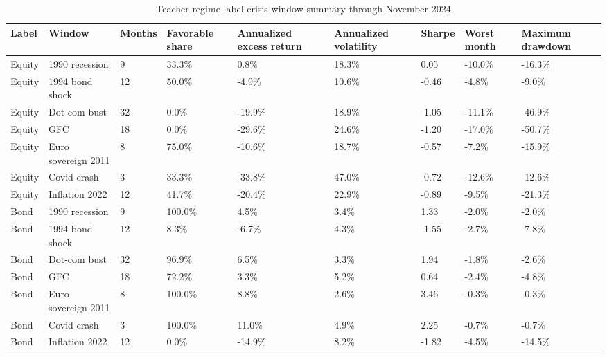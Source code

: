 \begin{table}[!htbp]
\centering
\caption{Teacher regime label crisis-window summary through November 2024}
\small
\begin{tabular}{lllllllll}
\toprule
Label & Window & Months & Favorable share & Annualized excess return & Annualized volatility & Sharpe & Worst month & Maximum drawdown \\
\midrule
Equity & 1990 recession & 9 & 33.3\% & 0.8\% & 18.3\% & 0.05 & -10.0\% & -16.3\% \\
Equity & 1994 bond shock & 12 & 50.0\% & -4.9\% & 10.6\% & -0.46 & -4.8\% & -9.0\% \\
Equity & Dot-com bust & 32 & 0.0\% & -19.9\% & 18.9\% & -1.05 & -11.1\% & -46.9\% \\
Equity & GFC & 18 & 0.0\% & -29.6\% & 24.6\% & -1.20 & -17.0\% & -50.7\% \\
Equity & Euro sovereign 2011 & 8 & 75.0\% & -10.6\% & 18.7\% & -0.57 & -7.2\% & -15.9\% \\
Equity & Covid crash & 3 & 33.3\% & -33.8\% & 47.0\% & -0.72 & -12.6\% & -12.6\% \\
Equity & Inflation 2022 & 12 & 41.7\% & -20.4\% & 22.9\% & -0.89 & -9.5\% & -21.3\% \\
Bond & 1990 recession & 9 & 100.0\% & 4.5\% & 3.4\% & 1.33 & -2.0\% & -2.0\% \\
Bond & 1994 bond shock & 12 & 8.3\% & -6.7\% & 4.3\% & -1.55 & -2.7\% & -7.8\% \\
Bond & Dot-com bust & 32 & 96.9\% & 6.5\% & 3.3\% & 1.94 & -1.8\% & -2.6\% \\
Bond & GFC & 18 & 72.2\% & 3.3\% & 5.2\% & 0.64 & -2.4\% & -4.8\% \\
Bond & Euro sovereign 2011 & 8 & 100.0\% & 8.8\% & 2.6\% & 3.46 & -0.3\% & -0.3\% \\
Bond & Covid crash & 3 & 100.0\% & 11.0\% & 4.9\% & 2.25 & -0.7\% & -0.7\% \\
Bond & Inflation 2022 & 12 & 0.0\% & -14.9\% & 8.2\% & -1.82 & -4.5\% & -14.5\% \\
\bottomrule
\end{tabular}
\end{table}